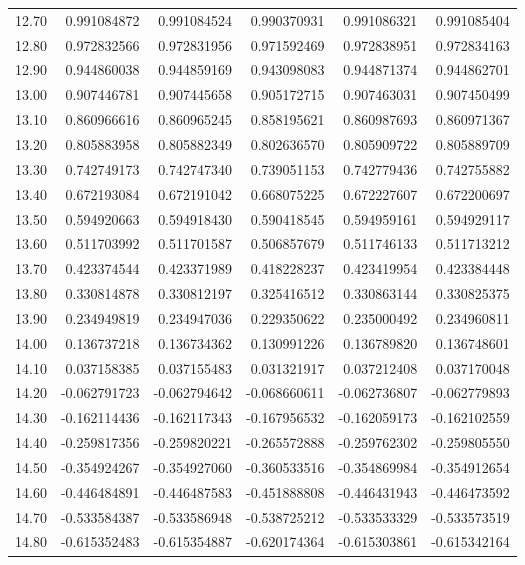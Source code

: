 \documentclass[11pt,a4paper]{article}
\begin{document}
\begin{longtable}{rrrrrr}
12.70 & 0.991084872 & 0.991084524 & 0.990370931 & 0.991086321 & 0.991085404 \\
12.80 & 0.972832566 & 0.972831956 & 0.971592469 & 0.972838951 & 0.972834163 \\
12.90 & 0.944860038 & 0.944859169 & 0.943098083 & 0.944871374 & 0.944862701 \\
13.00 & 0.907446781 & 0.907445658 & 0.905172715 & 0.907463031 & 0.907450499 \\
13.10 & 0.860966616 & 0.860965245 & 0.858195621 & 0.860987693 & 0.860971367 \\
13.20 & 0.805883958 & 0.805882349 & 0.802636570 & 0.805909722 & 0.805889709 \\
13.30 & 0.742749173 & 0.742747340 & 0.739051153 & 0.742779436 & 0.742755882 \\
13.40 & 0.672193084 & 0.672191042 & 0.668075225 & 0.672227607 & 0.672200697 \\
13.50 & 0.594920663 & 0.594918430 & 0.590418545 & 0.594959161 & 0.594929117 \\
13.60 & 0.511703992 & 0.511701587 & 0.506857679 & 0.511746133 & 0.511713212 \\
13.70 & 0.423374544 & 0.423371989 & 0.418228237 & 0.423419954 & 0.423384448 \\
13.80 & 0.330814878 & 0.330812197 & 0.325416512 & 0.330863144 & 0.330825375 \\
13.90 & 0.234949819 & 0.234947036 & 0.229350622 & 0.235000492 & 0.234960811 \\
14.00 & 0.136737218 & 0.136734362 & 0.130991226 & 0.136789820 & 0.136748601 \\
14.10 & 0.037158385 & 0.037155483 & 0.031321917 & 0.037212408 & 0.037170048 \\
14.20 & -0.062791723 & -0.062794642 & -0.068660611 & -0.062736807 & -0.062779893 \\
14.30 & -0.162114436 & -0.162117343 & -0.167956532 & -0.162059173 & -0.162102559 \\
14.40 & -0.259817356 & -0.259820221 & -0.265572888 & -0.259762302 & -0.259805550 \\
14.50 & -0.354924267 & -0.354927060 & -0.360533516 & -0.354869984 & -0.354912654 \\
14.60 & -0.446484891 & -0.446487583 & -0.451888808 & -0.446431943 & -0.446473592 \\
14.70 & -0.533584387 & -0.533586948 & -0.538725212 & -0.533533329 & -0.533573519 \\
14.80 & -0.615352483 & -0.615354887 & -0.620174364 & -0.615303861 & -0.615342164 \\

\end{longtable}
\end{document}
